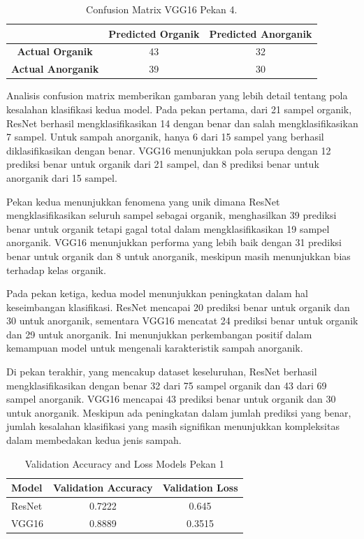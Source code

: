 \documentclass[12pt,a4paper]{article}
\begin{document}
\begin{table}[H]
\centering
\begin{tabular}{|c|c|c|}
    \hline
    & \textbf{Predicted Organik} & \textbf{Predicted Anorganik} \\
    \hline
    \textbf{Actual Organik} & 43 & 32 \\
    \hline
    \textbf{Actual Anorganik} & 39 & 30 \\
    \hline
\end{tabular}
\caption{Confusion Matrix VGG16 Pekan 4.}
\end{table}

Analisis confusion matrix memberikan gambaran yang lebih detail tentang pola kesalahan klasifikasi kedua model. Pada pekan pertama, dari 21 sampel organik, ResNet berhasil mengklasifikasikan 14 dengan benar dan salah mengklasifikasikan 7 sampel. Untuk sampah anorganik, hanya 6 dari 15 sampel yang berhasil diklasifikasikan dengan benar. VGG16 menunjukkan pola serupa dengan 12 prediksi benar untuk organik dari 21 sampel, dan 8 prediksi benar untuk anorganik dari 15 sampel.

Pekan kedua menunjukkan fenomena yang unik dimana ResNet mengklasifikasikan seluruh sampel sebagai organik, menghasilkan 39 prediksi benar untuk organik tetapi gagal total dalam mengklasifikasikan 19 sampel anorganik. VGG16 menunjukkan performa yang lebih baik dengan 31 prediksi benar untuk organik dan 8 untuk anorganik, meskipun masih menunjukkan bias terhadap kelas organik.

Pada pekan ketiga, kedua model menunjukkan peningkatan dalam hal keseimbangan klasifikasi. ResNet mencapai 20 prediksi benar untuk organik dan 30 untuk anorganik, sementara VGG16 mencatat 24 prediksi benar untuk organik dan 29 untuk anorganik. Ini menunjukkan perkembangan positif dalam kemampuan model untuk mengenali karakteristik sampah anorganik.

Di pekan terakhir, yang mencakup dataset keseluruhan, ResNet berhasil mengklasifikasikan dengan benar 32 dari 75 sampel organik dan 43 dari 69 sampel anorganik. VGG16 mencapai 43 prediksi benar untuk organik dan 30 untuk anorganik. Meskipun ada peningkatan dalam jumlah prediksi yang benar, jumlah kesalahan klasifikasi yang masih signifikan menunjukkan kompleksitas dalam membedakan kedua jenis sampah.

\begin{table}[H]
\centering
\begin{tabular}{|l|c|c|}
    \hline
    \textbf{Model} & \textbf{Validation Accuracy} & \textbf{Validation Loss} \\
    \hline
    ResNet & 0.7222 & 0.645 \\
    \hline
    VGG16 & 0.8889 & 0.3515 \\
    \hline
\end{tabular}
\caption{Validation Accuracy and Loss Models Pekan 1}
\end{table}
\end{document}
